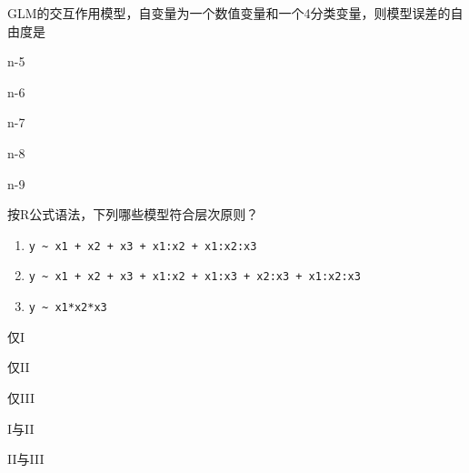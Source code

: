 \par\addvspace{6pt}\noindent\begin{minipage}{\linewidth}


GLM的交互作用模型，自变量为一个数值变量和一个4分类变量，则模型误差的自由度是


\begin{choices}

\item n-5

\item n-6

\item n-7

\item n-8

\item n-9

\end{choices}

\end{minipage}\par\vspace{4pt}

\par\addvspace{6pt}\noindent\begin{minipage}{\linewidth}


按R公式语法，下列哪些模型符合层次原则？

\begin{enumerate}
\def\labelenumi{\Roman{enumi}.}
\item
  \texttt{y\ \textasciitilde{}\ x1\ +\ x2\ +\ x3\ +\ x1:x2\ +\ x1:x2:x3}
\item
  \texttt{y\ \textasciitilde{}\ x1\ +\ x2\ +\ x3\ +\ x1:x2\ +\ x1:x3\ +\ x2:x3\ +\ x1:x2:x3}
\item
  \texttt{y\ \textasciitilde{}\ x1*x2*x3}
\end{enumerate}

\begin{choices}

\item 仅I

\item 仅II

\item 仅III

\item I与II

\item II与III

\end{choices}

\end{minipage}\par\vspace{4pt}

